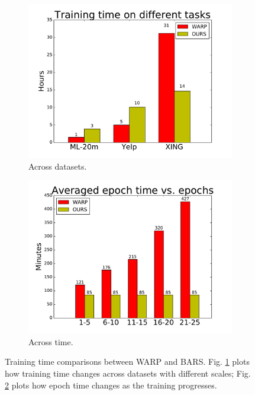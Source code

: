 \documentclass[letterpaper]{article}
\begin{document}
\begin{figure}
\centering
\begin{subfigure}{.25\textwidth}
  \centering
  \includegraphics[width=.99\linewidth]{pics/tconv-eps-converted-to}
  \caption{Across datasets.}
  \label{fig:tconv}
\end{subfigure}%
\begin{subfigure}{.25\textwidth}
  \centering
  \includegraphics[width=.99\linewidth]{pics/tepoch-eps-converted-to}
  \caption{Across time.}
  \label{fig:tepoch}
\end{subfigure}
\caption{Training time comparisons between WARP and BARS. Fig. \ref{fig:tconv} plots how training time changes across datasets with different scales; Fig. \ref{fig:tepoch} plots how epoch time changes as the training progresses. }
\label{fig:time}
\end{figure}
\end{document}
